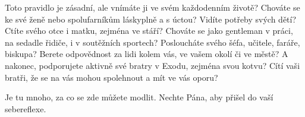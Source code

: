 \documentclass[11pt]{article}
\begin{document}
Toto pravidlo je zásadní, ale vnímáte ji ve svém každodenním životě? Chováte se ke své ženě nebo spolufarníkům
láskyplně a s úctou? Vidíte potřeby svých dětí? Ctíte svého otce i matku, zejména ve stáří? Chováte se jako gentleman
v práci, na sedadle řidiče, i v soutěžních sportech? Posloucháte svého šéfa, učitele, faráře, biskupa? Berete odpovědnost
za lidi kolem vás, ve vašem okolí či ve městě? A nakonec, podporujete aktivně své bratry v Exodu, zejména svou kotvu?
Cítí vaši bratři, že se na vás mohou spolehnout a mít ve vás oporu?

Je tu mnoho, za co se zde můžete modlit. Nechte Pána, aby přišel do vaší sebereflexe.
\end{document}
